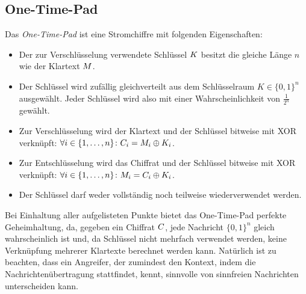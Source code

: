 \subsection{One-Time-Pad}
\label{ssec:otp}
Das \emph{One-Time-Pad} \indexOTP ist eine Stromchiffre mit folgenden Eigenschaften:
\begin{itemize}
\item Der zur Verschlüsselung verwendete Schlüssel $K$ besitzt die
  gleiche Länge $n$ wie der Klartext $M$. 
\item Der Schlüssel wird zufällig gleichverteilt aus dem Schlüsselraum
  $K \in \{0,1\}^{n}$ ausgewählt. Jeder Schlüssel wird also mit einer
  Wahrscheinlichkeit von $\frac{1}{2^{n}}$ gewählt. 
\item Zur Verschlüsselung wird der Klartext und der Schlüssel bitweise
  mit XOR verknüpft: $\forall i \in \{1,\dots,n\}\colon C_i =
  M_i\oplus K_i$. 
\item Zur Entschlüsselung wird das Chiffrat und der Schlüssel bitweise
  mit XOR verknüpft: $\forall i \in \{1,\dots,n\}\colon M_i =
  C_i\oplus K_i$.
\item Der Schlüssel darf weder vollständig noch teilweise
  wiederverwendet werden. 
\end{itemize}
Bei Einhaltung aller aufgelisteten Punkte bietet das One-Time-Pad
perfekte Geheimhaltung, da, gegeben ein Chiffrat $C$, jede
Nachricht $\{0,1\}^{n}$ gleich wahrscheinlich ist und, da Schlüssel
nicht mehrfach verwendet werden, keine Verknüpfung mehrerer Klartexte
berechnet werden kann. Natürlich ist zu beachten, dass ein Angreifer,
der zumindest den Kontext, indem die Nachrichtenübertragung stattfindet,
kennt, sinnvolle von sinnfreien Nachrichten unterscheiden kann.

